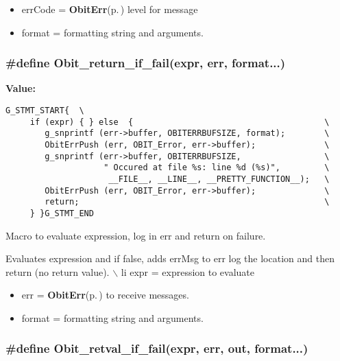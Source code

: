 \begin{itemize}
\item err\-Code = {\bf Obit\-Err}{\rm (p.\,\pageref{structObitErr})} level for message \item format = formatting string and arguments. \end{itemize}
\subsubsection{\setlength{\rightskip}{0pt plus 5cm}\#define Obit\_\-return\_\-if\_\-fail(expr, err, format...)}\label{ObitErr_8h_a3}


{\bf Value:}

\footnotesize\begin{verbatim}G_STMT_START{  \
     if (expr) { } else  {                                       \
        g_snprintf (err->buffer, OBITERRBUFSIZE, format);        \
        ObitErrPush (err, OBIT_Error, err->buffer);              \
        g_snprintf (err->buffer, OBITERRBUFSIZE,                 \
                    " Occured at file %s: line %d (%s)",         \
                     __FILE__, __LINE__, __PRETTY_FUNCTION__);   \
        ObitErrPush (err, OBIT_Error, err->buffer);              \
        return;                                                  \
     } }G_STMT_END
\end{verbatim}\normalsize 
Macro to evaluate expression, log in err and return on failure. 

Evaluates expression and if false, adds err\-Msg to err log the location and then return (no return value). $\backslash$ li expr = expression to evaluate \begin{itemize}
\item err = {\bf Obit\-Err}{\rm (p.\,\pageref{structObitErr})} to receive messages. \item format = formatting string and arguments. \end{itemize}
\subsubsection{\setlength{\rightskip}{0pt plus 5cm}\#define Obit\_\-retval\_\-if\_\-fail(expr, err, out, format...)}\label{ObitErr_8h_a4}


